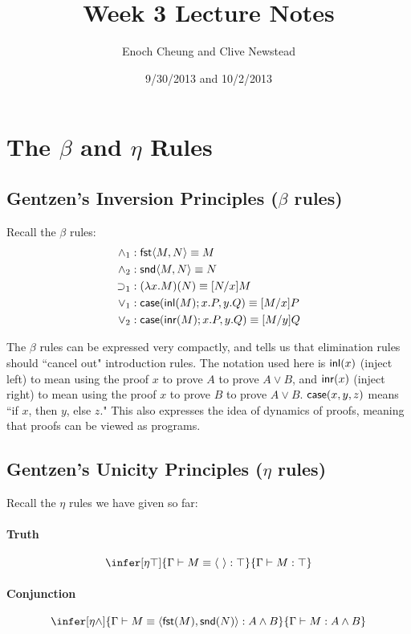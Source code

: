\documentclass[12pt]{article}
\begin{document}
\title{Week 3 Lecture Notes}
\author{Enoch Cheung and Clive Newstead}
\date{9/30/2013 and 10/2/2013}


\maketitle


\section{The $\beta$ and $\eta$ Rules}
\subsection{Gentzen's Inversion Principles ($\beta$ rules)}
Recall the $\beta$ rules:
\begin{align*}
  \wedge_1 & : \textsf{fst}\langle M,N\rangle \equiv M \\
  \wedge_2 & : \textsf{snd}\langle M,N\rangle \equiv N  \\
  \supset_1 & : (\lambda x.M)(N)\equiv [N/x]M \\
  \vee_1 & : \operatorname{\textsf{case}}({\mathsf{inl}}(M);x.P,y.Q)\equiv [M/x]P \\
  \vee_2 & : \operatorname{\textsf{case}}({\mathsf{inr}}(M);x.P,y.Q)\equiv [M/y]Q 
\end{align*}

The $\beta$ rules can be expressed very compactly, and tells us that elimination rules should ``cancel out" introduction rules. The notation used here is ${\mathsf{inl}}(x)$ (inject left) to mean using the proof $x$ to prove $A$ to prove $A\vee B$, and ${\mathsf{inr}}(x)$ (inject right) to mean using the proof $x$ to prove $B$ to prove $A\vee B$. $\operatorname{\textsf{case}}(x,y,z)$ means ``if $x$, then $y$, else $z$." This also expresses the idea of dynamics of proofs, meaning that proofs can be viewed as programs.

\subsection{Gentzen's Unicity Principles ($\eta$ rules)}
Recall the $\eta$ rules we have given so far:


\paragraph{Truth}
\[
\infer[\eta\top]{\Gamma\vdash M\equiv \langle \ \rangle: \top}{\Gamma\vdash M:\top}
\]

\paragraph{Conjunction}
\[
\infer[\eta\wedge]{\Gamma\vdash M\equiv \langle \fst(M),\snd(N)\rangle :A\wedge B }{\Gamma\vdash M:A\wedge B}
\]
\end{document}
